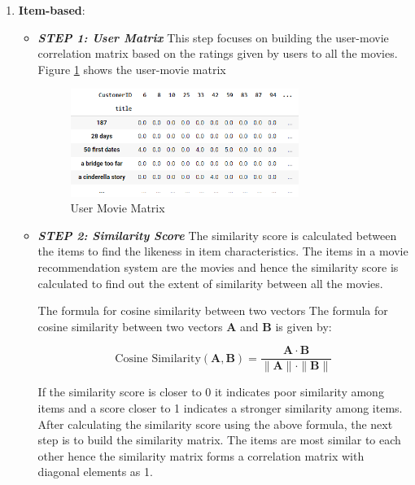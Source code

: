 \documentclass[a4paper,10pt]{article}
\begin{document}
\begin{enumerate}
    \item \textbf{Item-based}: 
    \vspace{2pt}
    \begin{itemize}
        \item  \textbf{\textit{STEP 1: User Matrix}}
        \vspace{2pt}
        This step focuses on building the user-movie correlation matrix based on the ratings given by users to all the movies. Figure \ref{user_movie} shows the user-movie matrix 

\begin{figure}[H]
    
        \centering
        \includegraphics[height=3.5cm]{figures/user_movie.png}
        \caption{User Movie Matrix}
        \label{user_movie}
        
\end{figure}
 
    \item  \textbf{\textit{STEP 2: Similarity Score }} 
        The similarity score is calculated between the items to find the likeness in item characteristics. The items in a movie recommendation system are the movies and hence the similarity score is calculated to find out the extent of similarity between all the movies.

        The formula for cosine similarity between two vectors
The formula for cosine similarity between two vectors $\mathbf{A}$ and $\mathbf{B}$ is given by:

\[
\text{Cosine Similarity}(\mathbf{A}, \mathbf{B}) = \frac{\mathbf{A} \cdot \mathbf{B}}{\|\mathbf{A}\| \cdot \|\mathbf{B}\|}
\]


If the similarity score is closer to 0 it indicates poor similarity among items and a score closer to 1 indicates a stronger similarity among items. After calculating the similarity score using the above formula, the next step is to build the similarity matrix. 
The items are most similar to each other hence the similarity matrix forms a correlation matrix with diagonal elements as 1.


\end{itemize}
\end{enumerate}
\end{document}

